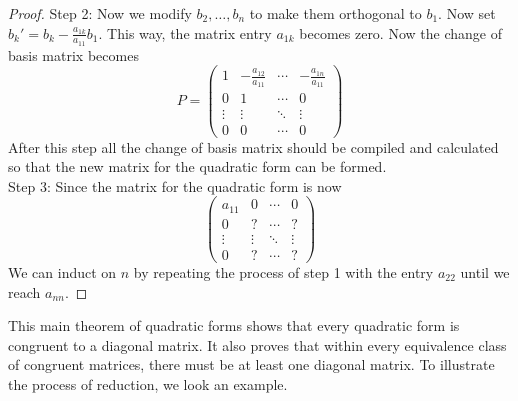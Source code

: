 \documentclass[a4paper]{article}
\begin{document}
\begin{thm}{}{}
\begin{proof}
Step 2: Now we modify $b_2,\dots,b_n$ to make them orthogonal to $b_1$. Now set $b_k'=b_k-\frac{a_{1k}}{a_{11}}b_1$. This way, the matrix entry $a_{1k}$ becomes zero. Now the change of basis matrix becomes $$P=\begin{pmatrix}
1 & -\frac{a_{12}}{a_{11}} & \cdots & -\frac{a_{1n}}{a_{11}}\\
0 & 1 & \cdots & 0\\
\vdots & \vdots & \ddots & \vdots\\
0 & 0 & \cdots & 0
\end{pmatrix}$$
After this step all the change of basis matrix should be compiled and calculated so that the new matrix for the quadratic form can be formed. \\
Step 3: Since the matrix for the quadratic form is now $$\begin{pmatrix}
a_{11} & 0 & \cdots & 0\\
0 & ? & \cdots & ?\\
\vdots & \vdots & \ddots & \vdots\\
0 & ? & \cdots & ?
\end{pmatrix}$$
We can induct on $n$ by repeating the process of step 1 with the entry $a_{22}$ until we reach $a_{nn}$. 
\end{proof}
\end{thm}

This main theorem of quadratic forms shows that every quadratic form is congruent to a diagonal matrix. It also proves that within every equivalence class of congruent matrices, there must be at least one diagonal matrix. To illustrate the process of reduction, we look an example. 
\end{document}
